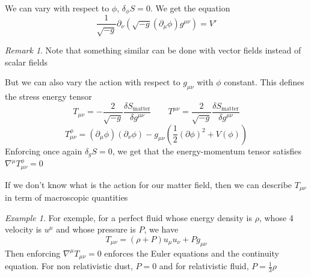 \documentclass[a4paper]{book}
\theoremstyle{definition}
\theoremstyle{remark}
\newtheorem*{remark}{Remark}
\newtheorem*{example}{Example}
\begin{document}
We can vary with respect to $\phi$, $\delta_\phi S = 0$. We get the equation 
\begin{equation}
    \frac{1}{\sqrt{-g}}\partial_\nu (\sqrt{-g}(\partial_\mu \phi)g^{\mu\nu}) = V'
\end{equation}
\begin{remark}
    Note that something similar can be done with vector fields instead of scalar fields
\end{remark}
But we can also vary the action with respect to $g_{\mu\nu}$ with $\phi$ constant. This defines the stress energy tensor 
\begin{equation}
    T_{\mu\nu} = -\frac{2}{\sqrt{-g}}\frac{\delta S_{\text{matter}}}{\delta g^{\mu\nu}} \qquad  T^{\mu\nu} = \frac{2}{\sqrt{-g}}\frac{\delta S_{\text{matter}}}{\delta g^{\mu\nu}} 
\end{equation}
\begin{equation}
    T^\phi_{\mu\nu} = (\partial_\mu\phi)(\partial_\nu \phi) - g_{\mu\nu}\left(\frac{1}{2}(\partial \phi)^2 + V(\phi)\right)
\end{equation}
Enforcing once again $\delta_g S = 0$, we get that the energy-momentum tensor satisfies $\nabla^\mu T^\phi_{\mu\nu} = 0$ \par \medskip 

If we don't know what is the action for our matter field, then we can describe $T_{\mu\nu}$ in term of macroscopic quantities

\begin{example}
    For exemple, for a perfect fluid whose energy density is $\rho$, whose 4 velocity is $u^\mu$ and whose pressure is $P$, we have 
    \begin{equation}
        T_{\mu\nu} = (\rho + P)u_\mu u_\nu + Pg_{\mu\nu}
    \end{equation}
    Then enforcing $\nabla^\mu T_{\mu\nu} = 0$ enforces the Euler equations and the continuity equation. For non relativistic dust, $P = 0$ and for relativistic fluid, $P = \frac{1}{3}\rho$
\end{example}
\end{document}
